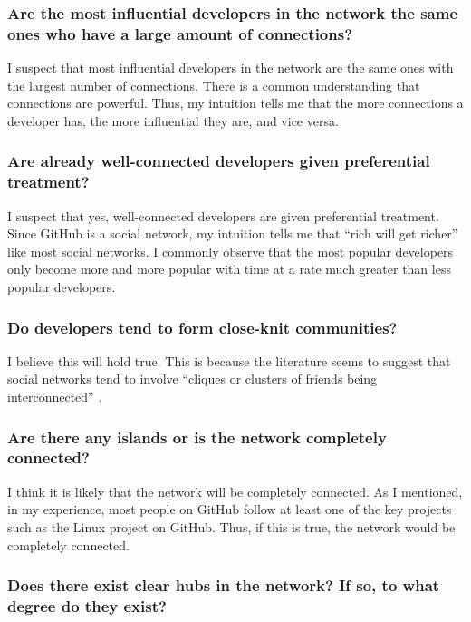 \documentclass[9pt,twocolumn,twoside]{pnas-new}
\begin{document}
\subsubsection{Are the most influential developers in the network the same ones who have a large amount of connections?}

I suspect that most influential developers in the network are the same ones with the largest number of connections. There is a common understanding that connections are powerful. Thus, my intuition tells me that the more connections a developer has, the more influential they are, and vice versa.

\subsubsection{Are already well-connected developers given preferential treatment?}

I suspect that yes, well-connected developers are given preferential treatment. Since GitHub is a social network, my intuition tells me that “rich will get richer” like most social networks. I commonly observe that the most popular developers only become more and more popular with time at a rate much greater than less popular developers.

\subsubsection{Do developers tend to form close-knit communities?}

I believe this will hold true. This is because the literature seems to suggest that social networks tend to involve “cliques or clusters of friends being interconnected” \cite{PMC3604768}.

\subsubsection{Are there any islands or is the network completely connected?}

I think it is likely that the network will be completely connected. As I mentioned, in my experience, most people on GitHub follow at least one of the key projects such as the Linux project on GitHub. Thus, if this is true, the network would be completely connected.

\subsubsection{Does there exist clear hubs in the network? If so, to what degree do they exist?}
\end{document}
